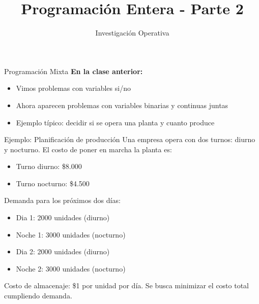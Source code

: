 \documentclass{beamer}
\title{\Huge\textbf{Programación Entera - Parte 2}}
\author{Investigación Operativa}
\date{}
\begin{document}
\begin{frame}
    \titlepage
\end{frame}

\begin{frame}{Programación Mixta}
    \textbf{En la clase anterior:}
    \begin{itemize}
        \item Vimos problemas con variables si/no
        \item Ahora aparecen problemas con variables binarias y continuas juntas
        \item Ejemplo típico: decidir si se opera una planta y cuanto produce
    \end{itemize}
\end{frame}

\begin{frame}{Ejemplo: Planificación de producción}
    Una empresa opera con dos turnos: diurno y nocturno. El costo de poner en marcha la planta es:
    \begin{itemize}
        \item Turno diurno: \$8.000
        \item Turno nocturno: \$4.500
    \end{itemize}
    \vspace{0.5em}
    Demanda para los próximos dos días:
    \begin{itemize}
        \item Dia 1: 2000 unidades (diurno)
        \item Noche 1: 3000 unidades (nocturno)
        \item Dia 2: 2000 unidades (diurno)
        \item Noche 2: 3000 unidades (nocturno)
    \end{itemize}
    Costo de almacenaje: \$1 por unidad por día. Se busca minimizar el costo total cumpliendo demanda.
\end{frame}

\end{document}
